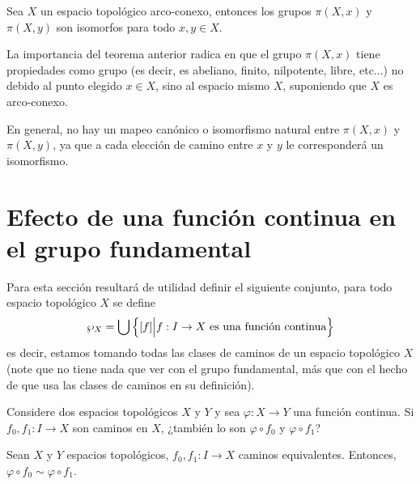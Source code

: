 \documentclass[12pt]{report}
\theoremstyle{largebreak}
\newcommand\cf[3]{\ensuremath{#1:#2\rightarrow#3}}
\begin{document}
    \begin{cor}
        Sea $X$ un espacio topológico arco-conexo, entonces los grupos $\pi(X,x)$ y $\pi(X,y)$ son isomorfos para todo $x,y\in X$.
    \end{cor}

    La importancia del teorema anterior radica en que el grupo $\pi(X,x)$ tiene propiedades como grupo (es decir, es abeliano, finito, nilpotente, libre, etc...) no debido al punto elegido $x\in X$, sino al espacio mismo $X$, suponiendo que $X$ es arco-conexo.

    En general, no hay un mapeo canónico o isomorfismo natural entre $\pi(X,x)$ y $\pi(X,y)$, ya que a cada elección de camino entre $x$ y $y$ le corresponderá un isomorfismo.

    \section{Efecto de una función continua en el grupo fundamental}

    \begin{obs}
        Para esta sección resultará de utilidad definir el siguiente conjunto, para todo espacio topológico $X$ se define
        \begin{equation*}
            \wp_X = \bigcup \left\{[f]\Big|\cf{f}{I}{X}\textup{ es una función continua} \right\}
        \end{equation*}
        es decir, estamos tomando todas las clases de caminos de un espacio topológico $X$ (note que no tiene nada que ver con el grupo fundamental, más que con el hecho de que usa las clases de caminos en su definición).
    \end{obs}

    Considere dos espacios topológicos $X$ y $Y$ y sea $\cf{\varphi}{X}{Y}$ una función continua. Si $\cf{f_0,f_1}{I}{X}$ son caminos en $X$, ¿también lo son $\varphi\circ f_0$ y $\varphi\circ f_1$?

    \begin{propo}
        Sean $X$ y $Y$ espacios topológicos, $\cf{f_0,f_1}{I}{X}$ caminos equivalentes. Entonces, $\varphi\circ f_0\sim \varphi\circ f_1$.
    \end{propo}
\end{document}
